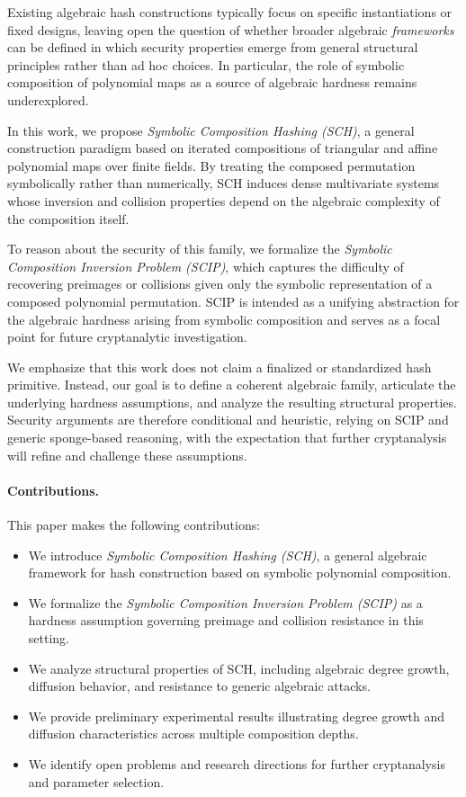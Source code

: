 ﻿\documentclass[english]{aucmcs}
\begin{document}
Existing algebraic hash constructions typically focus on specific instantiations or fixed designs, leaving open the question of whether broader algebraic \emph{frameworks} can be defined in which security properties emerge from general structural principles rather than ad hoc choices. In particular, the role of symbolic composition of polynomial maps as a source of algebraic hardness remains underexplored.

In this work, we propose \emph{Symbolic Composition Hashing (SCH)}, a general construction paradigm based on iterated compositions of triangular and affine polynomial maps over finite fields. By treating the composed permutation symbolically rather than numerically, SCH induces dense multivariate systems whose inversion and collision properties depend on the algebraic complexity of the composition itself.

To reason about the security of this family, we formalize the \emph{Symbolic Composition Inversion Problem (SCIP)}, which captures the difficulty of recovering preimages or collisions given only the symbolic representation of a composed polynomial permutation. SCIP is intended as a unifying abstraction for the algebraic hardness arising from symbolic composition and serves as a focal point for future cryptanalytic investigation.

We emphasize that this work does not claim a finalized or standardized hash primitive. Instead, our goal is to define a coherent algebraic family, articulate the underlying hardness assumptions, and analyze the resulting structural properties. Security arguments are therefore conditional and heuristic, relying on SCIP and generic sponge-based reasoning, with the expectation that further cryptanalysis will refine and challenge these assumptions.

\paragraph{Contributions.}
This paper makes the following contributions:
\begin{itemize}
  \item We introduce \emph{Symbolic Composition Hashing (SCH)}, a general algebraic framework for hash construction based on symbolic polynomial composition.
  \item We formalize the \emph{Symbolic Composition Inversion Problem (SCIP)} as a hardness assumption governing preimage and collision resistance in this setting.
  \item We analyze structural properties of SCH, including algebraic degree growth, diffusion behavior, and resistance to generic algebraic attacks.
  \item We provide preliminary experimental results illustrating degree growth and diffusion characteristics across multiple composition depths.
  \item We identify open problems and research directions for further cryptanalysis and parameter selection.
\end{itemize}
\end{document}
